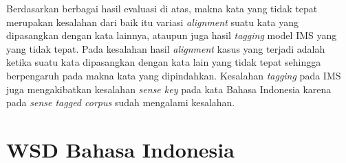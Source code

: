 Berdasarkan berbagai hasil evaluasi di atas, makna kata yang tidak tepat merupakan kesalahan dari baik itu variasi \textit{alignment} suatu kata yang dipasangkan dengan kata lainnya, ataupun juga hasil \textit{tagging} model IMS yang yang tidak tepat. Pada kesalahan hasil \textit{alignment} kasus yang terjadi adalah ketika suatu kata dipasangkan dengan kata lain yang tidak tepat sehingga berpengaruh pada makna kata yang dipindahkan. Kesalahan \textit{tagging} pada IMS juga mengakibatkan kesalahan \textit{sense key} pada kata Bahasa Indonesia karena pada \textit{sense tagged corpus} sudah mengalami kesalahan.
\section{WSD Bahasa Indonesia}

